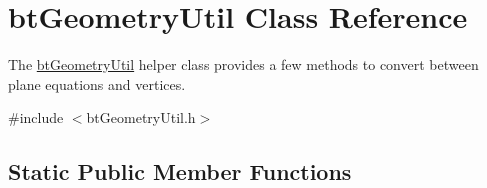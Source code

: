 \hypertarget{classbtGeometryUtil}{}\section{bt\+Geometry\+Util Class Reference}
\label{classbtGeometryUtil}


The \hyperlink{classbtGeometryUtil}{bt\+Geometry\+Util} helper class provides a few methods to convert between plane equations and vertices.  




{\ttfamily \#include $<$bt\+Geometry\+Util.\+h$>$}

\subsection*{Static Public Member Functions}
